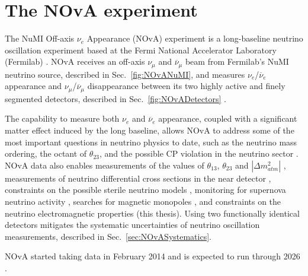 \chapter{The NOvA experiment}\label{sec:NOvA}

The NuMI Off-axis $\nu_e$ Appearance (NOvA) experiment \cite{NOvAWebsite} is a long-baseline neutrino oscillation experiment based at the Fermi National Accelerator Laboratory (Fermilab) \cite{FNALWebsite}. NOvA receives an off-axis $\nu_\mu$ and $\overline{\nu}_\mu$ beam from Fermilab's NuMI neutrino source, described in Sec.~\ref{fig:NOvANuMI}, and measures $\nu_e$/$\overline{\nu}_e$ appearance and $\nu_\mu$/$\overline{\nu}_\mu$ disappearance between its two highly active and finely segmented detectors, described in Sec.~\ref{fig:NOvADetectors} \cite{PhysicsOfNOvA.pdf}. 

The capability to measure both $\nu_e$ and $\overline{\nu}_e$ appearance, coupled with a significant matter effect induced by the long baseline, allows NOvA to address some of the most important questions in neutrino physics to date, such as the neutrino mass ordering, the octant of $\theta_{23}$, and the possible CP violation in the neutrino sector \cite{PhysicsOfNOvA.pdf,NOvAStatusAndOutlook.pdf,FirstNOvAResult.pdf,2019NOvAFHCRHCResults.pdf,NOvAResults2021.pdf}. NOvA data also enables measurements of the values of $\theta_{13}$, $\theta_{23}$ and $\left|\Delta m^2_{atm}\right|$ \cite{PhysicsOfNOvA.pdf}, measurements of neutrino differential cross sections in the near detector \cite{NOvANCPi0XSecMeasurement2019.pdf, NOvANumuCCXSexMeasurement2023.pdf, NOvANueCCXSecMeasurement2023.pdf, NOvANuMuCCPi0XSecMeasurement2023.pdf}, constraints on the possible sterile neutrino models \cite{NOvASterilesFHCResults2017.pdf, NOvASterilesFHCRHCResults2021.pdf}, monitoring for supernova neutrino activity \cite{NOvASupernovaMeasurements2020.pdf, NOvASupernovaCoincidenceMeasurements2021.pdf}, searches for magnetic monopoles \cite{NOvASlowMagMonopoles2021.pdf}, and constraints on the neutrino electromagnetic properties (this thesis). Using two functionally identical detectors mitigates the systematic uncertainties of neutrino oscillation measurements, described in Sec.~\ref{sec:NOvASystematics}.


NOvA started taking data in February 2014 and is expected to run through 2026 \cite{NOvAHalfTimeOverview2022.pdf}.

